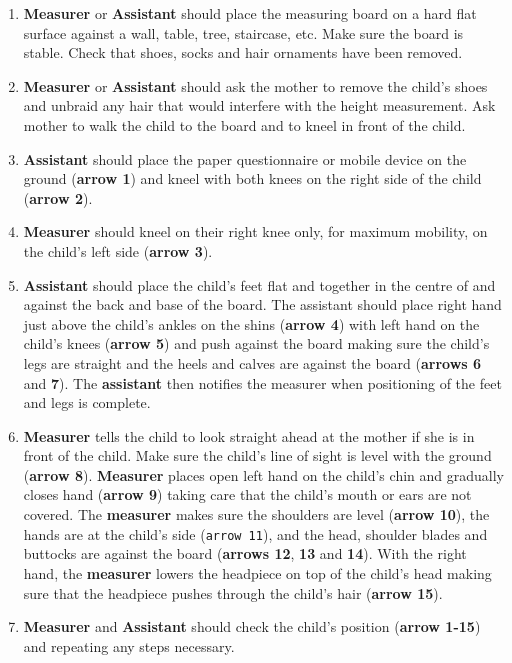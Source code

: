 \documentclass[
  12pt,
]{book}
\begin{document}
\begin{enumerate}
\def\labelenumi{\arabic{enumi}.}
\item
  \textbf{Measurer} or \textbf{Assistant} should place the measuring board on a hard flat surface against a wall, table, tree, staircase, etc. Make sure the board is stable. Check that shoes, socks and hair ornaments have been removed.
\item
  \textbf{Measurer} or \textbf{Assistant} should ask the mother to remove the child's shoes and unbraid any hair that would interfere with the height measurement. Ask mother to walk the child to the board and to kneel in front of the child.
\item
  \textbf{Assistant} should place the paper questionnaire or mobile device on the ground (\textbf{arrow 1}) and kneel with both knees on the right side of the child (\textbf{arrow 2}).
\item
  \textbf{Measurer} should kneel on their right knee only, for maximum mobility, on the child's left side (\textbf{arrow 3}).
\item
  \textbf{Assistant} should place the child's feet flat and together in the centre of and against the back and base of the board. The assistant should place right hand just above the child's ankles on the shins (\textbf{arrow 4}) with left hand on the child's knees (\textbf{arrow 5}) and push against the board making sure the child's legs are straight and the heels and calves are against the board (\textbf{arrows 6} and \textbf{7}). The \textbf{assistant} then notifies the measurer when positioning of the feet and legs is complete.
\item
  \textbf{Measurer} tells the child to look straight ahead at the mother if she is in front of the child. Make sure the child's line of sight is level with the ground (\textbf{arrow 8}). \textbf{Measurer} places open left hand on the child's chin and gradually closes hand (\textbf{arrow 9}) taking care that the child's mouth or ears are not covered. The \textbf{measurer} makes sure the shoulders are level (\textbf{arrow 10}), the hands are at the child's side (\texttt{arrow\ 11}), and the head, shoulder blades and buttocks are against the board (\textbf{arrows 12}, \textbf{13} and \textbf{14}). With the right hand, the \textbf{measurer} lowers the headpiece on top of the child's head making sure that the headpiece pushes through the child's hair (\textbf{arrow 15}).
\item
  \textbf{Measurer} and \textbf{Assistant} should check the child's position (\textbf{arrow 1-15}) and repeating any steps necessary.

\end{enumerate}
\end{document}
